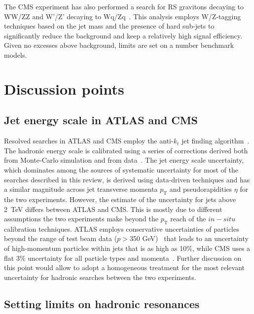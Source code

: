 \documentclass{PoS}
\newcommand{\antikt}{anti-$k_t$}
\begin{document}
The CMS experiment has also performed a search for RS gravitons decaying to 
WW/ZZ and W'/Z' decaying to Wq/Zq~\cite{Chatrchyan:2012ypy}. This analysis employs 
W/Z-tagging techniques based on the jet mass and the presence
of hard sub-jets to significantly reduce the background and keep a relatively high signal efficiency. 
Given no excesses above background, limits are set on a number benchmark models. 

\section{Discussion points}

\subsection{Jet energy scale in ATLAS and CMS}

Resolved searches in ATLAS and CMS employ the \antikt{} jet finding algorithm~\cite{Cacciari:2008gp}.
The hadronic energy scale is calibrated using a series of corrections 
derived both from Monte-Carlo simulation and from 
data~\cite{ATLAS-CONF-2013-004, 1748-0221-6-11-P11002, Aad:2011he}. 
The jet energy scale uncertainty, which dominates among the sources of systematic 
uncertainty for most of the searches described in this review, is derived using data-driven 
techniques and has a similar magnitude across
jet transverse momenta $p_\mathrm{T}$ and pseudorapidities $\eta$ for the two experiments. 
However, 
the estimate of the uncertainty for jets above 2~TeV differs between ATLAS and CMS. 
This is mostly due to different assumptions the two experiments make beyond the
$p_\mathrm{T}$ reach of the $in-situ$ calibration techniques. ATLAS employs conservative
uncertainties of particles beyond the range of test beam data ($p>$350 GeV)~
\cite{Aad:2012vm} that leads to an uncertainty of high-momentum particles within jets that is as high as 10\%, 
while CMS uses a flat 3\% uncertainty for all particle types and momenta~\cite{CMS-PAS-JME-10-008}. 
Further discussion on this point would allow to adopt a homogeneous treatment for 
the most relevant uncertainty for hadronic searches between the two experiments. 

\subsection{Setting limits on hadronic resonances}
\end{document}
